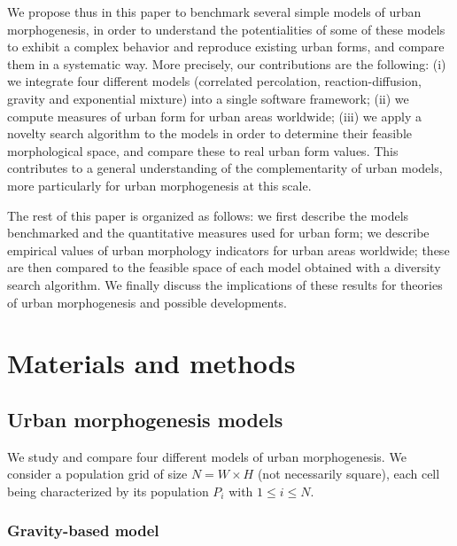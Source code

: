\documentclass[10pt,letterpaper]{article}
\begin{document}
We propose thus in this paper to benchmark several simple models of urban morphogenesis, in order to understand the potentialities of some of these models to exhibit a complex behavior and reproduce existing urban forms, and compare them in a systematic way. More precisely, our contributions are the following: (i) we integrate four different models (correlated percolation, reaction-diffusion, gravity and exponential mixture) into a single software framework; (ii) we compute measures of urban form for urban areas worldwide; (iii) we apply a novelty search algorithm to the models in order to determine their feasible morphological space, and compare these to real urban form values. This contributes to a general understanding of the complementarity of urban models, more particularly for urban morphogenesis at this scale.



The rest of this paper is organized as follows: we first describe the models benchmarked and the quantitative measures used for urban form; we describe empirical values of urban morphology indicators for urban areas worldwide; these are then compared to the feasible space of each model obtained with a diversity search algorithm. We finally discuss the implications of these results for theories of urban morphogenesis and possible developments.



\section*{Materials and methods}


\subsection*{Urban morphogenesis models}

We study and compare four different models of urban morphogenesis. We consider a population grid of size $N = W\times H$ (not necessarily square), each cell being characterized by its population $P_i$ with $1\leq i \leq N$.

\subsubsection*{Gravity-based model}
\end{document}
